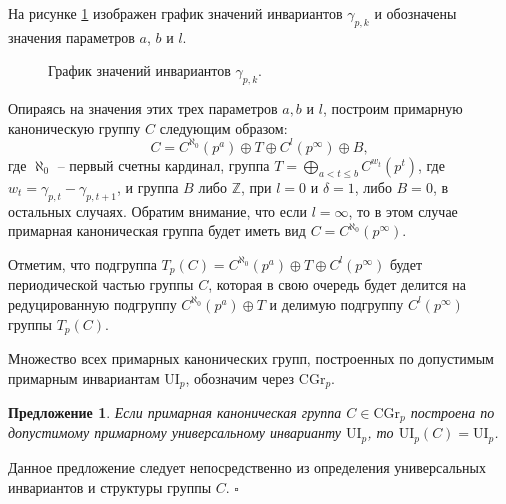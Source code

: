 \documentclass[a4paper,11pt,twoside]{article}
\newtheorem{proposition}{Предложение}[section]
\def\proof{{\noindent{\bf Доказательство.}} }
\def\Z{{\mathbb{Z}}}
\def\CG{{\mathrm{CGr}}}
\def\ui{{\mathrm{UI}}}
\begin{document}
На рисунке \ref{pic:GammaPK} изображен график значений инвариантов $\gamma_{p,k}$ и обозначены значения параметров $a$, $b$ и $l$.

\begin{figure}[h!]
\centering
{}
\caption{График значений инвариантов $\gamma_{p,k}.$}\label{pic:GammaPK}
\end{figure}


Опираясь на значения этих трех параметров $a, b$ и $l$, построим примарную каноническую группу $C$ следующим образом:
$$C = C^{\aleph_0}(p^a) \oplus T \oplus C^l(p^\infty) \oplus B ,$$
где $\aleph_0$ -- первый счетны кардинал, группа $T = \bigoplus\limits_{ a < t \leq b} C^{w_t}(p^t)$, где $w_t = \gamma_{p,t} - \gamma_{p,t+1}$, и группа $B$ либо $\Z$, при $l = 0$ и $\delta = 1$, либо $B = 0$, в остальных случаях. Обратим внимание, что если $l = \infty$, то в этом случае примарная каноническая группа будет иметь вид $C = C^{\aleph_0}(p^\infty)$.

Отметим, что подгруппа $T_p(C) = C^{\aleph_0}(p^a) \oplus T \oplus C^l(p^\infty)$ будет периодической частью группы $C$, которая в свою очередь будет делится на редуцированную подгруппу $C^{\aleph_0}(p^a) \oplus T$ и делимую подгруппу $C^l(p^\infty)$ группы $T_p(C)$.

Множество всех примарных канонических групп, построенных по допустимым примарным инвариантам $\ui_p$, обозначим через $\CG_p$.

\begin{proposition}\label{prop:UnivEnvForCannonicalGroup}
Если примарная каноническая группа $C \in \CG_p$ построена по допустимому примарному универсальному инварианту $\ui_p$, то $\ui_p(C) = \ui_p$.
\end{proposition}
\proof Данное предложение следует непосредственно из определения универсальных инвариантов и структуры группы $C$. $\square$
\end{document}
